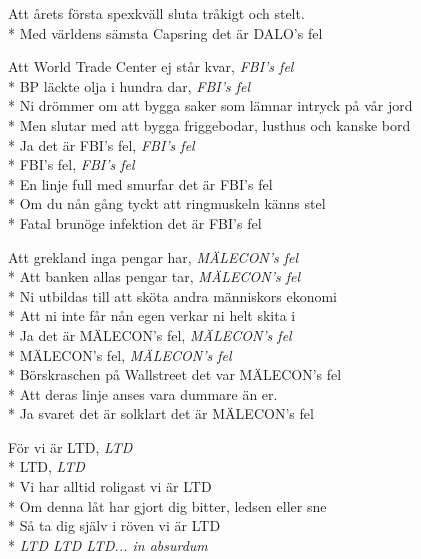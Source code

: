 \begin{SongText}
\begin{SongVerse}
    Att årets första spexkväll sluta tråkigt och stelt.\\*%
    Med världens sämsta Capsring det är DALO's fel
\end{SongVerse}
\begin{SongVerse}
    Att World Trade Center ej står kvar, \textit{FBI's fel}\\*%
    BP läckte olja i hundra dar, \textit{FBI's fel}\\*%
    Ni drömmer om att bygga saker som lämnar intryck på vår jord\\*%
    Men slutar med att bygga friggebodar, lusthus och kanske bord\\*%
    Ja det är FBI's fel, \textit{FBI's fel}\\*%
    FBI's fel, \textit{FBI's fel}\\*%
    En linje full med smurfar det är FBI's fel\\*%
    Om du nån gång tyckt att ringmuskeln känns stel\\*%
    Fatal brunöge infektion det är FBI's fel
\end{SongVerse}
\begin{SongVerse}
    Att grekland inga pengar har, \textit{MÄLECON's fel}\\*%
    Att banken allas pengar tar, \textit{MÄLECON's fel}\\*%
    Ni utbildas till att sköta andra människors ekonomi\\*%
    Att ni inte får nån egen verkar ni helt skita i\\*%
    Ja det är MÄLECON's fel, \textit{MÄLECON's fel}\\*%
    MÄLECON's fel, \textit{MÄLECON's fel}\\*%
    Börskraschen på Wallstreet det var MÄLECON's fel\\*%
    Att deras linje anses vara dummare än er.\\*%
    Ja svaret det är solklart det är MÄLECON's fel
\end{SongVerse}
\begin{SongVerse}
    För vi är LTD, \textit{LTD}\\*%
    LTD, \textit{LTD}\\*%
    Vi har alltid roligast vi är LTD\\*%
    Om denna låt har gjort dig bitter, ledsen eller sne\\*%
    Så ta dig själv i röven vi är LTD\\*%
    \textit{LTD LTD LTD... in absurdum}
\end{SongVerse}
\end{SongText}

